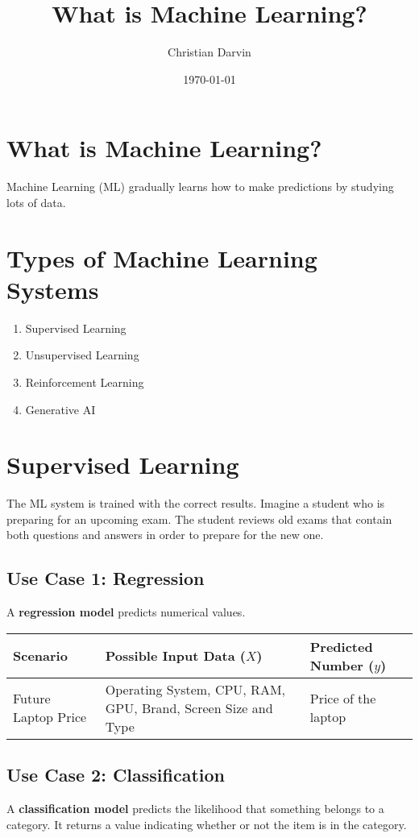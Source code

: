 \documentclass[a4paper,12pt]{article}
\title{What is Machine Learning?}
\author{Christian Darvin}
\date{\today}
\begin{document}
\maketitle
\tableofcontents
\newpage

\section{What is Machine Learning?}
Machine Learning (ML) gradually learns how to make predictions by studying lots of data.

\section{Types of Machine Learning Systems}
\begin{enumerate}
    \item Supervised Learning
    \item Unsupervised Learning
    \item Reinforcement Learning
    \item Generative AI
\end{enumerate}

\section{Supervised Learning}
The ML system is trained with the correct results. Imagine a student who is preparing for an upcoming exam. The student reviews old exams that contain both questions and answers in order to prepare for the new one.

\subsection{Use Case 1: Regression}
A \textbf{regression model} predicts numerical values.

\begin{center}
\begin{tabularx}{\textwidth}{@{}lXl@{}}
\toprule
Scenario & Possible Input Data ($X$) & Predicted Number ($y$) \\
\midrule
Future Laptop Price & Operating System, CPU, RAM, GPU, Brand, Screen Size and Type & Price of the laptop \\
\bottomrule
\end{tabularx}
\end{center}

\subsection{Use Case 2: Classification}
A \textbf{classification model} predicts the likelihood that something belongs to a category. It returns a value indicating whether or not the item is in the category.
\end{document}
